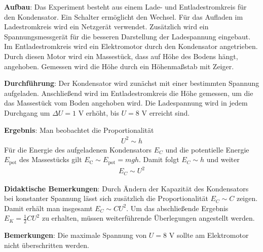 \documentclass[../main.tex]{subfiles}
\begin{document}
\begin{tcolorbox}
    \vspace{0.4cm}
    \textbf{Aufbau}: Das Experiment besteht aus einem Lade- und Entladestromkreis für den Kondensator. Ein Schalter ermöglicht den Wechsel. Für das Aufladen im Ladestromkreis wird ein Netzgerät verwendet. Zusätzlich wird ein Spannungsmessgerät für die besseren Darstellung der Ladespannung eingebaut. Im Entladestromkreis wird ein Elektromotor durch den Kondensator angetrieben. Durch diesen Motor wird ein Massestück, dass auf Höhe des Bodens hängt, angehoben. Gemessen wird die Höhe durch ein Höhenmaßstab mit Zeiger.   
    
    \vspace{0.4cm}
    \textbf{Durchführung}: Der Kondensator wird zunächst mit einer bestimmten Spannung aufgeladen. Anschließend wird im Entladestromkreis die Höhe gemessen, um die das Massestück vom Boden angehoben wird. Die Ladespannung wird in jedem Durchgang um $\Delta U=1$ V erhöht, bis $U=8$ V erreicht sind.

    \vspace{0.4cm}
    \textbf{Ergebnis}: Man beobachtet die Proportionalität
    \begin{align*}
        U^2 \sim h
    \end{align*}
    Für die Energie des aufgeladenen Kondensators $E_C$ und die potentielle Energie $E_{\text{pot}}$ des Massestücks gilt $E_{\text{C}} \sim E_{\text{pot}}=mgh$. Damit folgt $E_C \sim h$ und weiter
    \begin{align*}
        E_C \sim U^2
    \end{align*}
    
\vspace{0.4cm}
    \textbf{Didaktische Bemerkungen}: Durch Ändern der Kapazität des Kondensators bei konstanter Spannung lässt sich zusätzlich die Proportionalität $E_C \sim C$ zeigen. Damit erhält man insgesamt $E_C \sim CU^2$. Um das abschließende Ergebnis $E_K=\frac{1}{2}CU^2$ zu erhalten, müssen weiterführende Überlegungen angestellt werden. 

    \vspace{0.4cm}
    \textbf{Bemerkungen}: Die maximale Spannung von $U=8$ V sollte am Elektromotor nicht überschritten werden. 
\end{tcolorbox}
\end{document}
